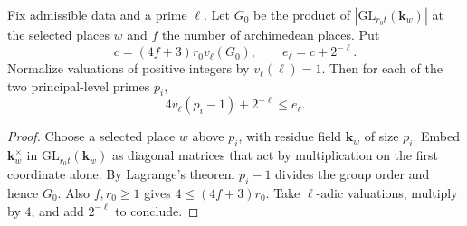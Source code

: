 \begin{lemma}
\label{lem:c-selmer-level-prime-loss}
\emitthmsource
Fix admissible data and a prime $\ell$. Let $G_0$ be the product of $|\mathrm{GL}_{r_0t}(\mathbf k_w)|$ at the selected places $w$ and $f$ the number of archimedean places. Put
\[
 c=(4f+3)r_0 v_\ell(G_0),\qquad e_\ell=c+2^{-\ell}.
\]
Normalize valuations of positive integers by $v_\ell(\ell)=1$. Then for each of the two principal-level primes $p_i$,
\[
 4v_\ell(p_i-1)+2^{-\ell}\le e_\ell .
\]
\end{lemma}
\begin{proof}
Choose a selected place $w$ above $p_i$, with residue field $\mathbf k_w$ of size $p_i$. Embed $\mathbf k_w^\times$ in $\mathrm{GL}_{r_0t}(\mathbf k_w)$ as diagonal matrices that act by multiplication on the first coordinate alone. By Lagrange's theorem $p_i-1$ divides the group order and hence $G_0$. Also $f,r_0\ge1$ gives $4\le(4f+3)r_0$. Take $\ell$-adic valuations, multiply by $4$, and add $2^{-\ell}$ to conclude.
\end{proof}

